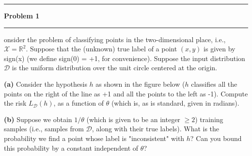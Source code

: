 \documentclass[11pt]{article}
\newcommand\question[2]{\vspace{.25in}\hrule\textbf{#1}\vspace{.5em}\hrule\vspace{.10in}}
\renewcommand\part[1]{\vspace{.10in}\textbf{(#1)}}
\begin{document}
\raggedright

\newcommand\NAME{Jake Pitkin}
\newcommand\UID{u0891770}
\newcommand\HWNUM{1}

\question{Problem 1}

Consider the problem of classifying points in the two-dimensional place, i.e., $\mathcal{X} = \mathbb{R}^2$. Suppose that the (unknown) true label of a point $(x, y)$ is given by sign(x) (we define sign(0) = +1, for convenience). Suppose the input distribution $\mathcal{D}$ is the uniform distribution over the unit circle centered at the origin.

\part{a} Consider the hypothesis $h$ as shown in the figure below ($h$ classifies all the points on the right of the line as +1 and all the points to the left as -1). Compute the risk $L_{\mathcal{D}}(h)$, as a function of $\theta$ (which is, as is standard, given in radians).



\part{b} Suppose we obtain $1/\theta$ (which is given to be an integer $\geq 2$) training samples (i.e., samples from $\mathcal{D}$, along with their true labels). What is the probability we find a point whose label is "inconsistent" with $h$? Can you bound this probability by a constant independent of $\theta$?
\end{document}
